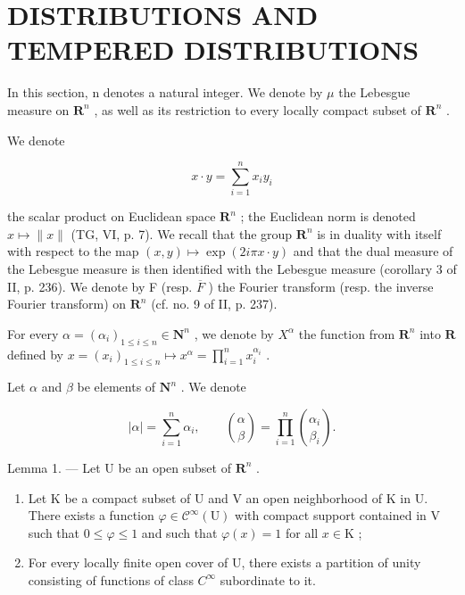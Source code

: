 \section{DISTRIBUTIONS AND TEMPERED DISTRIBUTIONS}

In this section, n denotes a natural integer. We denote by \(\mu\) the Lebesgue measure on \(\mathbf{R}^{n}\) , as well as its restriction to every locally compact subset of \(\mathbf{R}^{n}\) .

We denote

\[
x \cdot y = \sum_ {i = 1} ^ {n} x _ {i} y _ {i}
\]

the scalar product on Euclidean space \(\mathbf{R}^{n}\) ; the Euclidean norm is denoted \(x \mapsto \|x\|\) (TG, VI, p. 7). We recall that the group \(\mathbf{R}^{n}\) is in duality with itself with respect to the map \((x, y) \mapsto \exp(2i\pi x \cdot y)\) and that the dual measure of the Lebesgue measure is then identified with the Lebesgue measure (corollary 3 of II, p. 236). We denote by F (resp. \(\overline{F}\) ) the Fourier transform (resp. the inverse Fourier transform) on \(\mathbf{R}^{n}\) (cf. no. 9 of II, p. 237).

For every \(\alpha = (\alpha_{i})_{1\leqslant i\leqslant n}\in \mathbf{N}^{n}\) , we denote by \(X^{\alpha}\) the function from \(\mathbf{R}^n\) into \(\mathbf{R}\) defined by \(x = (x_{i})_{1\leqslant i\leqslant n}\mapsto x^{\alpha} = \prod_{i = 1}^{n}x_{i}^{\alpha_{i}}\) .

Let \(\alpha\) and \(\beta\) be elements of \(\mathbf{N}^n\) . We denote

\[
| \alpha | = \sum_ {i = 1} ^ {n} \alpha_ {i}, \qquad \binom{\alpha}{\beta} = \prod_ {i = 1} ^ {n} \binom{\alpha_ {i}}{\beta_ {i}}.
\]

Lemma 1. --- Let U be an open subset of \(\mathbf{R}^{n}\) .

\begin{enumerate}
\def\labelenumi{\alph{enumi})}
\item
  Let K be a compact subset of U and V an open neighborhood of K in U. There exists a function \(\varphi \in \mathcal{C}^{\infty}(\mathrm{U})\) with compact support contained in V such that \(0 \leqslant \varphi \leqslant 1\) and such that \(\varphi(x) = 1\) for all \(x \in \mathrm{K}\) ;
\item
  For every locally finite open cover of U, there exists a partition of unity consisting of functions of class \(C^{\infty}\) subordinate to it.
\end{enumerate}

